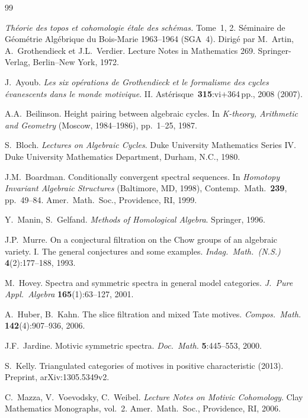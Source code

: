 \documentclass[12pt,a4paper]{article}
\theoremstyle{definition}
\begin{document}
\begin{thebibliography}{99}

\textit{Théorie des topos et cohomologie étale des schémas.}
Tome~1, 2. Séminaire de Géométrie Algébrique du Bois-Marie 1963--1964 (SGA~4).
Dirigé par M.\ Artin, A.\ Grothendieck et J.L.\ Verdier. Lecture Notes in Mathematics
269. Springer-Verlag, Berlin--New York, 1972.

J.\ Ayoub. \textit{Les six opérations de Grothendieck et le formalisme des cycles
évanescents dans le monde motivique}. II. Astérisque~\textbf{315}:vi+364\,pp.,
2008 (2007).

A.A.\ Beilinson. Height pairing between algebraic cycles. In
\textit{K-theory, Arithmetic and Geometry} (Moscow, 1984--1986), pp.\ 1--25, 1987.

S.\ Bloch. \textit{Lectures on Algebraic Cycles}. Duke University Mathematics Series
IV. Duke University Mathematics Department, Durham, N.C., 1980.

J.M.\ Boardman. Conditionally convergent spectral sequences.
In \textit{Homotopy Invariant Algebraic Structures} (Baltimore, MD, 1998),
Contemp.\ Math.\ \textbf{239}, pp.\ 49--84. Amer.\ Math.\ Soc., Providence, RI,
1999.

Y.\ Manin, S.\ Gelfand. \textit{Methods of Homological Algebra}. Springer, 1996.

J.P.\ Murre. On a conjectural filtration on the Chow groups of an algebraic variety.
I. The general conjectures and some examples.
\textit{Indag.\ Math.\ (N.S.)} \textbf{4}(2):177--188, 1993.

M.\ Hovey. Spectra and symmetric spectra in general model categories.
\textit{J.\ Pure Appl.\ Algebra} \textbf{165}(1):63--127, 2001.

A.\ Huber, B.\ Kahn. The slice filtration and mixed Tate motives.
\textit{Compos.\ Math.} \textbf{142}(4):907--936, 2006.

J.F.\ Jardine. Motivic symmetric spectra. \textit{Doc.\ Math.} \textbf{5}:445--553,
2000.

S.\ Kelly. Triangulated categories of motives in positive characteristic (2013).
Preprint, arXiv:1305.5349v2.

C.\ Mazza, V.\ Voevodsky, C.\ Weibel. \textit{Lecture Notes on Motivic Cohomology}.
Clay Mathematics Monographs, vol.\ 2. Amer.\ Math.\ Soc., Providence, RI, 2006.


\end{thebibliography}
\end{document}
